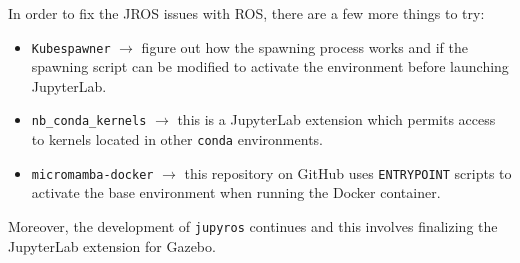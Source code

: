    In order to fix the JROS issues with ROS, there are a few more things to try:
    \begin{itemize}
        \item \texttt{Kubespawner} $\rightarrow$ figure out how the spawning process works and if the spawning script can be modified to activate the environment before launching JupyterLab.
        \item \texttt{nb\_conda\_kernels} $\rightarrow$ this is a JupyterLab extension which permits access to kernels located in other \texttt{conda} environments.
        \item \texttt{micromamba-docker} $\rightarrow$ this repository on GitHub uses \texttt{ENTRYPOINT} scripts to activate the base environment when running the Docker container.
    \end{itemize}

    Moreover, the development of \texttt{jupyros} continues and this involves finalizing the JupyterLab extension for Gazebo.